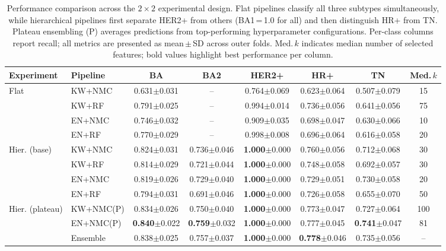 \begin{table}[!t]
\centering
\caption{Performance comparison across the $2 \times 2$ experimental design. Flat pipelines classify all three subtypes simultaneously, while hierarchical pipelines first separate HER2+ from others (BA1\,=\,1.0 for all) and then distinguish HR+ from TN. Plateau ensembling (P) averages predictions from top-performing hyperparameter configurations. Per-class columns report recall; all metrics are presented as mean\,$\pm$\,SD across outer folds. Med.\,$k$ indicates median number of selected features; bold values highlight best performance per column.}
\label{tab:results}
\footnotesize
\setlength{\tabcolsep}{3.5pt}
\begin{tabular}{llcccccc}
\toprule
Experiment & Pipeline & BA & BA2 & HER2+ & HR+ & TN & Med.\,$k$ \\
\midrule
  Flat & KW+NMC & 0.631$\pm$0.031 & -- & 0.764$\pm$0.069 & 0.623$\pm$0.064 & 0.507$\pm$0.079 & 15 \\
   & KW+RF & 0.791$\pm$0.025 & -- & 0.994$\pm$0.014 & 0.736$\pm$0.056 & 0.641$\pm$0.056 & 75 \\
   & EN+NMC & 0.746$\pm$0.032 & -- & 0.909$\pm$0.035 & 0.698$\pm$0.047 & 0.630$\pm$0.066 & 10 \\
   & EN+RF & 0.770$\pm$0.029 & -- & 0.998$\pm$0.008 & 0.696$\pm$0.064 & 0.616$\pm$0.058 & 20 \\
\midrule
  Hier. (base) & KW+NMC & 0.824$\pm$0.031 & 0.736$\pm$0.046 & \textbf{1.000}$\pm$0.000 & 0.760$\pm$0.056 & 0.712$\pm$0.068 & 30 \\
   & KW+RF & 0.814$\pm$0.029 & 0.721$\pm$0.044 & \textbf{1.000}$\pm$0.000 & 0.748$\pm$0.058 & 0.692$\pm$0.057 & 30 \\
   & EN+NMC & 0.819$\pm$0.026 & 0.729$\pm$0.040 & \textbf{1.000}$\pm$0.000 & 0.729$\pm$0.051 & 0.730$\pm$0.058 & 20 \\
   & EN+RF & 0.794$\pm$0.031 & 0.691$\pm$0.046 & \textbf{1.000}$\pm$0.000 & 0.726$\pm$0.058 & 0.655$\pm$0.070 & 50 \\
\midrule
  Hier. (plateau) & KW+NMC(P) & 0.834$\pm$0.026 & 0.750$\pm$0.040 & \textbf{1.000}$\pm$0.000 & 0.773$\pm$0.047 & 0.727$\pm$0.064 & 100 \\
   & EN+NMC(P) & \textbf{0.840}$\pm$0.022 & \textbf{0.759}$\pm$0.032 & \textbf{1.000}$\pm$0.000 & 0.777$\pm$0.045 & \textbf{0.741}$\pm$0.047 & 81 \\
   & Ensemble & 0.838$\pm$0.025 & 0.757$\pm$0.037 & \textbf{1.000}$\pm$0.000 & \textbf{0.778}$\pm$0.046 & 0.735$\pm$0.056 & -- \\
\bottomrule
\end{tabular}
\end{table}